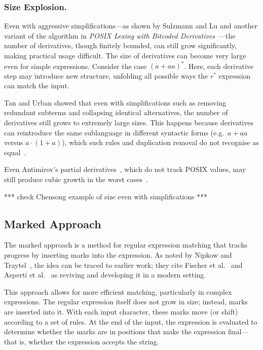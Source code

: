\documentclass[12pt]{article}
\begin{document}
\subsubsection{Size Explosion.}  

Even with aggressive simplifications—as shown by Sulzmann and Lu and another variant of the algorithm in \emph{POSIX Lexing 
with Bitcoded Derivatives}~\cite{TanAndUrban2023}—the number of derivatives, though finitely bounded, can still grow significantly, 
making practical usage difficult.  
The size of derivatives can become very large even for simple expressions.  
Consider the case $(a + aa)^*$.  
Here, each derivative step may introduce new structure, unfolding all possible ways the $r^*$ expression can match the input.  

Tan and Urban showed that even with simplifications such as removing redundant subterms and collapsing identical alternatives, 
the number of derivatives still grows to extremely large sizes.  
This happens because derivatives can reintroduce the same sublanguage in different syntactic forms 
(e.g.\ $a+aa$ versus $a \cdot (1+a)$), which such rules and duplication removal do not recognise as equal~\cite{TanAndUrban2023}.  

Even Antimirov’s partial derivatives~\cite{Antimirov1996}, which do not track POSIX values, may still produce cubic growth in the 
worst cases~\cite{Antimirov1996}.  %

*** check Chensong example of size even with simplifications ***

\subsection{Marked Approach}

The marked approach is a method for regular expression matching that tracks progress by inserting marks into the expression.  
As noted by Nipkow and Traytel~\cite{NipkowTraytel2014}, the idea can be traced to earlier work;  
they cite Fischer et al.~\cite{Fischer2010} and Asperti et al.~\cite{Asperti2010} as reviving and developing it in a modern setting.

This approach allows for more efficient matching, particularly in complex expressions.  
The regular expression itself does not grow in size; instead, marks are inserted into it.  
With each input character, these marks move (or shift) according to a set of rules.  
At the end of the input, the expression is evaluated to determine whether the marks are in positions that make the expression final—  
that is, whether the expression accepts the string.
\end{document}
